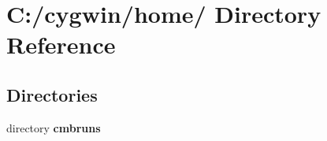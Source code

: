 \section{C:/cygwin/home/ Directory Reference}
\label{dir_000001}
\subsection*{Directories}
\begin{CompactItemize}
\item 
directory {\bf cmbruns}
\end{CompactItemize}
